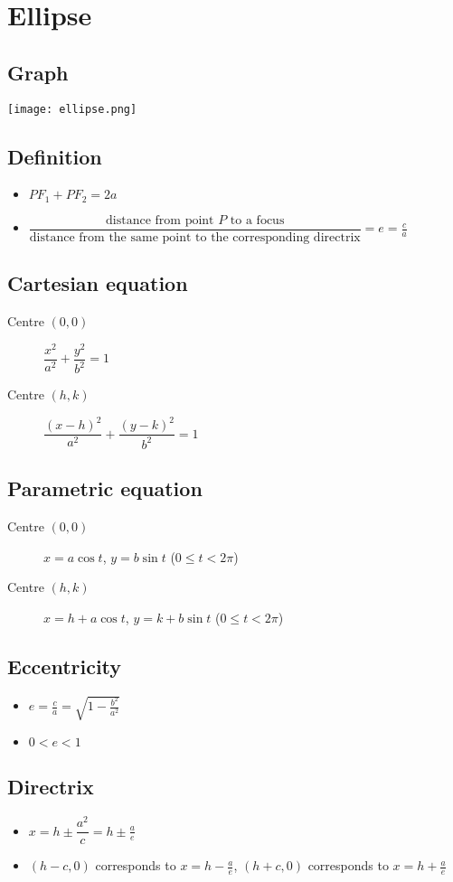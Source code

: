 \section{Ellipse}
\subsection{Graph}
\texttt{[image: ellipse.png]}
\subsection{Definition}
\begin{itemize}
    \item $PF_1 + PF_2 = 2a$
    \item $\dfrac{\text{distance from point $P$ to a focus}}{\text{distance from the same point to the corresponding directrix}}=e=\frac{c}{a}$
\end{itemize}
\subsection{Cartesian equation}
\begin{description}
    \item[Centre $(0,0)$] $\dfrac{x^2}{a^2}+\dfrac{y^2}{b^2}=1$
    \item[Centre $(h,k)$] $\dfrac{(x-h)^2}{a^2}+\dfrac{(y-k)^2}{b^2}=1$
\end{description}
\subsection{Parametric equation}
\begin{description}
    \item[Centre $(0,0)$] $x=a\cos t$, $y=b\sin t$ ($0\leq t < 2\pi$)
    \item[Centre $(h,k)$] $x=h+a\cos t$, $y=k+b\sin t$ ($0\leq t < 2\pi$)
\end{description}
\subsection{Eccentricity}
\begin{itemize}
    \item $e=\frac{c}{a}=\sqrt{1-\frac{b^2}{a^2}}$
    \item $0<e<1$
\end{itemize}
\subsection{Directrix}
\begin{itemize}
    \item $x=h\pm \dfrac{a^2}{c} = h\pm\frac{a}{e}$
    \item $(h-c, 0)$ corresponds to $x=h-\frac{a}{e}$, $(h+c, 0)$ corresponds to $x=h+\frac{a}{e}$
\end{itemize}
